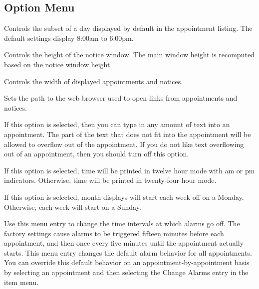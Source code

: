 \documentclass[a4paper,english]{article}
\begin{document}
    \subsection{Option Menu}
        \begin{Description}\setlength{\itemsep}{0cm}
        \item[Appointment Range]
            Controls the subset of a day displayed by default in the
            appointment listing.  The default settings display 8:00am
            to 6:00pm.

        \item[Notice Window Height]
            Controls the height of the notice window. The main window
            height is recomputed based on the notice window height.

        \item[Item Width]
            Controls the width of displayed appointments and notices.

        \item[Web Browser]
            Sets the path to the web browser used to open links from
            appointments and notices.

        \item[Allow Text Overflow]
            If this option is selected, then you can type in any
            amount of text into an appointment.  The part of the text
            that does not fit into the appointment will be allowed to
            overflow out of the appointment.  If you do not like text
            overflowing out of an appointment, then you should turn
            off this option.

        \item[Display Am/Pm]
            If this option is selected, time will be printed in twelve
            hour mode with am or pm indicators.  Otherwise, time will
            be printed in twenty-four hour mode.

        \item[Start Week on Monday]
            If this option is selected, month displays will start each
            week off on a Monday.  Otherwise, each week will start on
            a Sunday.

        \item[Default Alarms]
            Use this menu entry to change the time intervals at which
            alarms go off.  The factory settings cause alarms to be
            triggered fifteen minutes before each appointment, and
            then once every five minutes until the appointment
            actually starts.  This menu entry changes the default
            alarm behavior for all appointments.  You can override
            this default behavior on an appointment-by-appointment
            basis by selecting an appointment and then selecting the
            Change Alarms entry in the item menu.


\end{Description}
\end{document}
